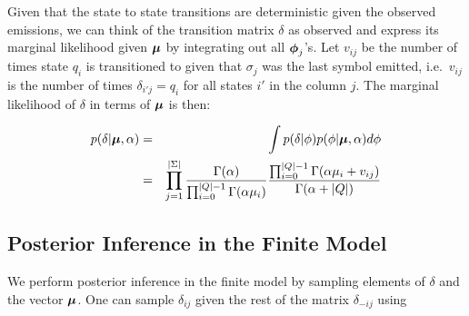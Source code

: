  
 
 Given that the state to state transitions are deterministic given the observed emissions, we can think of the transition matrix $\delta$ as observed and express its marginal likelihood given $\bmu$ by integrating out all $\bphi_j$'s.  Let $v_{ij}$ be the number of times state $q_i$ is transitioned to given that $\sigma_j$ was the last symbol emitted, i.e.~$v_{ij}$ is the number of times $\delta_{i'j} = q_i$ for all states $i'$ in the column $j$. %
The marginal likelihood of $\delta$ in terms of $\bmu$ is then:
 
 \begin{eqnarray}
 p(\delta|\bmu,\alpha) & = & \int p(\delta|\phi)p(\phi|\bmu,\alpha) d\phi \label{delta:factor}\\
  & = &  \prod_{j=1}^{|\Sigma|} \frac{\Gamma(\alpha)}{\prod_{i=0}^{|Q|-1}\Gamma(\alpha\mu_i)} \frac{\prod_{i=0}^{|Q|-1} \Gamma(\alpha\mu_i + v_{ij})}{\Gamma(\alpha + |Q|)} \label{delta:end}
  \end{eqnarray}



 
 \subsection{Posterior Inference in the Finite Model}
 
We perform posterior inference in the finite model by sampling elements of $\delta$ and the vector $\bmu$.  %
One can sample $\delta_{ij}$ given the rest of the matrix $\delta_{-ij}$ using 

